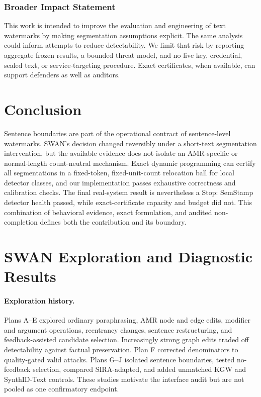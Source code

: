 \documentclass[10pt]{article}
\begin{document}
\subsubsection*{Broader Impact Statement}

This work is intended to improve the evaluation and engineering of text
watermarks by making segmentation assumptions explicit. The same analysis
could inform attempts to reduce detectability. We limit that risk by
reporting aggregate frozen results, a bounded threat model, and no live key,
credential, sealed text, or service-targeting procedure. Exact certificates,
when available, can support defenders as well as auditors.

\section{Conclusion}

Sentence boundaries are part of the operational contract of sentence-level
watermarks. SWAN's decision changed reversibly under a short-text
segmentation intervention, but the available evidence does not isolate an
AMR-specific or normal-length count-neutral mechanism. Exact dynamic
programming can certify all segmentations in a fixed-token,
fixed-unit-count relocation ball for local detector classes, and our
implementation passes exhaustive correctness and calibration checks. The
final real-system result is nevertheless a Stop: SemStamp detector health
passed, while exact-certificate capacity and budget did not. This combination
of behavioral evidence, exact formulation, and audited non-completion defines
both the contribution and its boundary.




\appendix

\section{SWAN Exploration and Diagnostic Results}

\paragraph{Exploration history.}
Plans A--E explored ordinary paraphrasing, AMR node and edge edits, modifier
and argument operations, reentrancy changes, sentence restructuring, and
feedback-assisted candidate selection. Increasingly strong graph edits traded
off detectability against factual preservation. Plan F corrected denominators
to quality-gated valid attacks. Plans G--J isolated sentence boundaries,
tested no-feedback selection, compared SIRA-adapted, and added unmatched KGW
and SynthID-Text controls. These studies motivate the interface audit but are
not pooled as one confirmatory endpoint.
\end{document}
